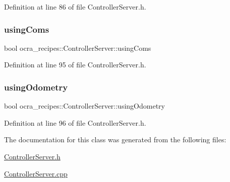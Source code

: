 Definition at line 86 of file Controller\+Server.\+h.

\hypertarget{classocra__recipes_1_1ControllerServer_a7f7559e938ca0e3cfff4833d86ef5b54}{}\label{classocra__recipes_1_1ControllerServer_a7f7559e938ca0e3cfff4833d86ef5b54} 
\subsubsection{\texorpdfstring{using\+Coms}{usingComs}}
{\footnotesize\ttfamily bool ocra\+\_\+recipes\+::\+Controller\+Server\+::using\+Coms\hspace{0.3cm}{\ttfamily [protected]}}



Definition at line 95 of file Controller\+Server.\+h.

\hypertarget{classocra__recipes_1_1ControllerServer_afd126a8b289e29213468fe9e9a800dd2}{}\label{classocra__recipes_1_1ControllerServer_afd126a8b289e29213468fe9e9a800dd2} 
\subsubsection{\texorpdfstring{using\+Odometry}{usingOdometry}}
{\footnotesize\ttfamily bool ocra\+\_\+recipes\+::\+Controller\+Server\+::using\+Odometry\hspace{0.3cm}{\ttfamily [protected]}}



Definition at line 96 of file Controller\+Server.\+h.



The documentation for this class was generated from the following files\+:\begin{DoxyCompactItemize}
\item 
\hyperlink{ControllerServer_8h}{Controller\+Server.\+h}\item 
\hyperlink{ControllerServer_8cpp}{Controller\+Server.\+cpp}\end{DoxyCompactItemize}

